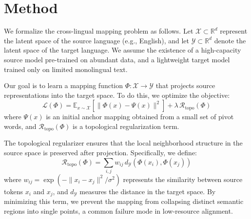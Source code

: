 \section{Method}
We formalize the cross-lingual mapping problem as follows. Let $\mathcal{X} \subset \mathbb{R}^d$ represent the latent space of the source language (e.g., English), and let $\mathcal{Y} \subset \mathbb{R}^d$ denote the latent space of the target language. We assume the existence of a high-capacity source model pre-trained on abundant data, and a lightweight target model trained only on limited monolingual text.

Our goal is to learn a mapping function $\Phi: \mathcal{X} \to \mathcal{Y}$ that projects source representations into the target space. To do this, we optimize the objective:
\begin{equation}
\mathcal{L}(\Phi) = \mathbb{E}_{x \sim \mathcal{X}} \left[ \| \Phi(x) - \Psi(x) \|^2 \right] + \lambda \, \mathcal{R}_{\text{topo}}(\Phi)
\label{eq:objective}
\end{equation}
where $\Psi(x)$ is an initial anchor mapping obtained from a small set of pivot words, and $\mathcal{R}_{\text{topo}}(\Phi)$ is a topological regularization term.

The topological regularizer ensures that the local neighborhood structure in the source space is preserved after projection. Specifically, we define:
\begin{equation}
\mathcal{R}_{\text{topo}}(\Phi) = \sum_{i,j} w_{ij} \, d_{\mathcal{Y}}(\Phi(x_i), \Phi(x_j))
\label{eq:regularization}
\end{equation}
where $w_{ij} = \exp(-\|x_i - x_j\|^2 / \sigma^2)$ represents the similarity between source tokens $x_i$ and $x_j$, and $d_{\mathcal{Y}}$ measures the distance in the target space. By minimizing this term, we prevent the mapping from collapsing distinct semantic regions into single points, a common failure mode in low-resource alignment.

